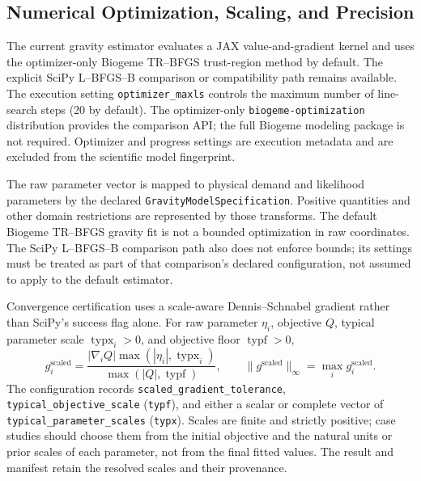 
\begingroup
{}


\subsection{Numerical Optimization, Scaling, and Precision}
\label{sec:reduced-od-numerical-contract}

The current gravity estimator evaluates a JAX value-and-gradient kernel and
uses the optimizer-only Biogeme TR--BFGS trust-region method by default.  The
explicit SciPy L--BFGS--B comparison or compatibility path remains available.
The execution setting
\texttt{optimizer\_maxls} controls the maximum number of line-search steps
(20 by default).  The optimizer-only
\texttt{biogeme-optimization} distribution provides the comparison API; the
full Biogeme modeling package is not required.  Optimizer and progress
settings are execution metadata and are excluded from the scientific model
fingerprint.

The raw parameter vector is mapped to physical demand and likelihood
parameters by the declared \texttt{GravityModelSpecification}.  Positive
quantities and other domain restrictions are represented by those transforms.
The default Biogeme TR--BFGS gravity fit is not a bounded optimization in raw
coordinates.  The SciPy L--BFGS--B comparison path also does not enforce
bounds; its settings must be treated as part of that comparison's declared
configuration, not assumed to apply to the default estimator.

Convergence certification uses a scale-aware Dennis--Schnabel gradient rather
than SciPy's success flag alone.  For raw parameter $\eta_i$, objective $Q$,
typical parameter scale $\operatorname{typx}_i>0$, and objective floor
$\operatorname{typf}>0$,
\[
 g^{\mathrm{scaled}}_i
 =\frac{|\nabla_i Q|\max(|\eta_i|,\operatorname{typx}_i)}
        {\max(|Q|,\operatorname{typf})},
 \qquad
 \|g^{\mathrm{scaled}}\|_\infty
 =\max_i g^{\mathrm{scaled}}_i .
\]
The configuration records \texttt{scaled\_gradient\_tolerance},
\texttt{typical\_objective\_scale} (\texttt{typf}), and either a scalar or
complete vector of \texttt{typical\_parameter\_scales} (\texttt{typx}).
Scales are finite and strictly positive; case studies should choose them from
the initial objective and the natural units or prior scales of each parameter,
not from the final fitted values.  The result and manifest retain the resolved
scales and their provenance.

